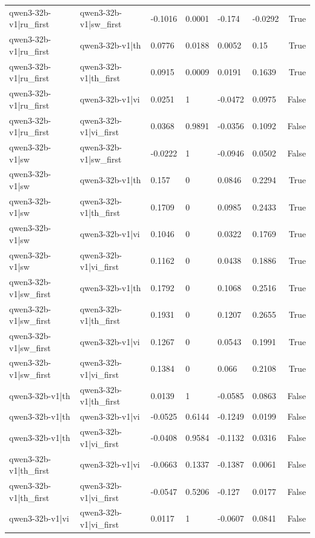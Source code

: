 \begin{table}
\begin{tabular}{llllllr}
qwen3-32b-v1|ru_first & qwen3-32b-v1|sw_first & -0.1016 & 0.0001 & -0.174 & -0.0292 & True \\
qwen3-32b-v1|ru_first & qwen3-32b-v1|th & 0.0776 & 0.0188 & 0.0052 & 0.15 & True \\
qwen3-32b-v1|ru_first & qwen3-32b-v1|th_first & 0.0915 & 0.0009 & 0.0191 & 0.1639 & True \\
qwen3-32b-v1|ru_first & qwen3-32b-v1|vi & 0.0251 & 1 & -0.0472 & 0.0975 & False \\
qwen3-32b-v1|ru_first & qwen3-32b-v1|vi_first & 0.0368 & 0.9891 & -0.0356 & 0.1092 & False \\
qwen3-32b-v1|sw & qwen3-32b-v1|sw_first & -0.0222 & 1 & -0.0946 & 0.0502 & False \\
qwen3-32b-v1|sw & qwen3-32b-v1|th & 0.157 & 0 & 0.0846 & 0.2294 & True \\
qwen3-32b-v1|sw & qwen3-32b-v1|th_first & 0.1709 & 0 & 0.0985 & 0.2433 & True \\
qwen3-32b-v1|sw & qwen3-32b-v1|vi & 0.1046 & 0 & 0.0322 & 0.1769 & True \\
qwen3-32b-v1|sw & qwen3-32b-v1|vi_first & 0.1162 & 0 & 0.0438 & 0.1886 & True \\
qwen3-32b-v1|sw_first & qwen3-32b-v1|th & 0.1792 & 0 & 0.1068 & 0.2516 & True \\
qwen3-32b-v1|sw_first & qwen3-32b-v1|th_first & 0.1931 & 0 & 0.1207 & 0.2655 & True \\
qwen3-32b-v1|sw_first & qwen3-32b-v1|vi & 0.1267 & 0 & 0.0543 & 0.1991 & True \\
qwen3-32b-v1|sw_first & qwen3-32b-v1|vi_first & 0.1384 & 0 & 0.066 & 0.2108 & True \\
qwen3-32b-v1|th & qwen3-32b-v1|th_first & 0.0139 & 1 & -0.0585 & 0.0863 & False \\
qwen3-32b-v1|th & qwen3-32b-v1|vi & -0.0525 & 0.6144 & -0.1249 & 0.0199 & False \\
qwen3-32b-v1|th & qwen3-32b-v1|vi_first & -0.0408 & 0.9584 & -0.1132 & 0.0316 & False \\
qwen3-32b-v1|th_first & qwen3-32b-v1|vi & -0.0663 & 0.1337 & -0.1387 & 0.0061 & False \\
qwen3-32b-v1|th_first & qwen3-32b-v1|vi_first & -0.0547 & 0.5206 & -0.127 & 0.0177 & False \\
qwen3-32b-v1|vi & qwen3-32b-v1|vi_first & 0.0117 & 1 & -0.0607 & 0.0841 & False \\
\bottomrule
\end{tabular}
\end{table}
